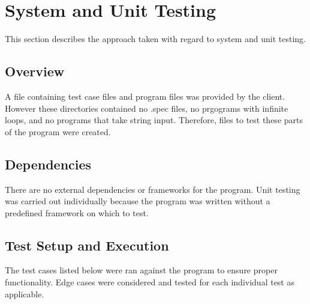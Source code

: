 
\chapter{System  and Unit Testing}

This section describes the approach taken with regard to system and unit testing. 

\section{Overview}
A file containing test case files and program files was provided by the client. However these directories contained no .spec files, no prgograms with infinite loops, and no programs that take string input. Therefore, files to test these parts of the program were created. 

\section{Dependencies}
There are no external dependencies or frameworks for the program. Unit testing was carried out individually because the program was written without a predefined framework on which to test. 

\section{Test Setup and Execution}
The test cases listed below were ran against the program to ensure proper functionality.  Edge cases were considered and tested for each individual test as applicable.

